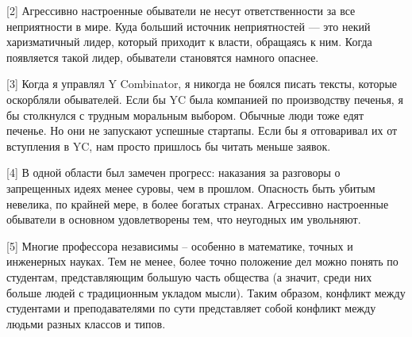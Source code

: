\documentclass[ebook,12pt,oneside,openany]{memoir}
\begin{document}
[2] Агрессивно настроенные обыватели не несут ответственности за все
неприятности в мире. Куда больший источник неприятностей — это некий
харизматичный лидер, который приходит к власти, обращаясь к ним. Когда
появляется такой лидер, обыватели становятся намного опаснее. \newline

[3] Когда я управлял Y Combinator, я никогда не боялся писать тексты,
которые оскорбляли обывателей. Если бы YC была компанией по
производству печенья, я бы столкнулся с трудным моральным выбором.
Обычные люди тоже едят печенье. Но они не запускают успешные стартапы.
Если бы я отговаривал их от вступления в YC, нам просто пришлось бы
читать меньше заявок. \newline

[4] В одной области был замечен прогресс: наказания за разговоры о
запрещенных идеях менее суровы, чем в прошлом. Опасность быть убитым
невелика, по крайней мере, в более богатых странах. Агрессивно
настроенные обыватели в основном удовлетворены тем, что неугодных им
увольняют. \newline

[5] Многие профессора независимы – особенно в математике, точных и
инженерных науках. Тем не менее, более точно положение дел можно
понять по студентам, представляющим большую часть общества (а значит,
среди них больше людей с традиционным укладом мысли). Таким образом,
конфликт между студентами и преподавателями по сути представляет собой
конфликт между людьми разных классов и типов.
\end{document}
